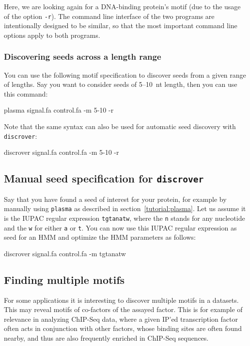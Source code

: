 \documentclass[a4paper]{article}
\newcommand{\plasma}[0]{\texttt{plasma}}
\newcommand{\discrover}[0]{\texttt{discrover}}
\begin{document}
Here, we are looking again for a DNA-binding protein's motif (due to the usage of the option \verb|-r|).
The command line interface of the two programs are intentionally designed to be similar, so that the most important command line options apply to both programs.

\subsubsection{Discovering seeds across a length range}
You can use the following motif specification to discover seeds from a given range of lengths.
Say you want to consider seeds of 5--10~nt length, then you can use this command:\\
\begin{verbbox}
plasma signal.fa control.fa -m 5-10 -r
\end{verbbox}
\fbox{\theverbbox[t]}

Note that the same syntax can also be used for automatic seed discovery with \discrover{}:
\\
\begin{verbbox}
discrover signal.fa control.fa -m 5-10 -r
\end{verbbox}
\fbox{\theverbbox[t]}



\subsection{Manual seed specification for \discrover{}}
Say that you have found a seed of interest for your protein, for example by manually using \plasma{} as described in section~\ref{tutorial:plasma}.
Let us assume it is the IUPAC regular expression \verb|tgtanatw|, where the \verb|n| stands for any nucleotide and the \verb|w| for either \verb|a| or \verb|t|.
You can now use this IUPAC regular expression as seed for an HMM and optimize the HMM parameters as follows:\\
\begin{verbbox}
discrover signal.fa control.fa -m tgtanatw
\end{verbbox}
\fbox{\theverbbox[t]}


\subsection{Finding multiple motifs}
For some applications it is interesting to discover multiple motifs in a datasets.
This may reveal motifs of co-factors of the assayed factor.
This is for example of relevance in analyzing ChIP-Seq data, where a given IP'ed transcription factor often acts in conjunction with other factors, whose binding sites are often found nearby, and thus are also frequently enriched in ChIP-Seq sequences.
\end{document}
